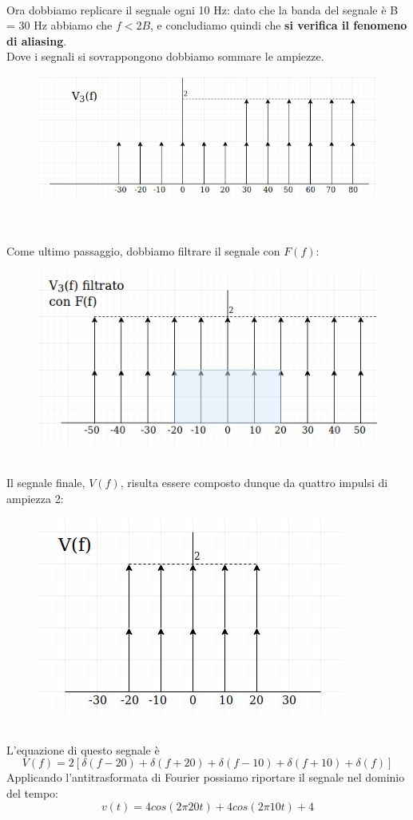 \documentclass[12pt,a4paper]{article}
\begin{document}
	\\Ora dobbiamo replicare il segnale ogni 10 Hz: dato che la banda del segnale è B = 30 Hz abbiamo che $f < 2B$, e concludiamo quindi che \textbf{si verifica il fenomeno di aliasing}.\\Dove i segnali si sovrappongono dobbiamo sommare le ampiezze.
	\begin{figure}[h!]
		\centering
		\includegraphics[scale=0.4]{./images/fourier54_6.png}
	\end{figure}
	\\ \\Come ultimo passaggio, dobbiamo filtrare il segnale con $F(f)$:
	\begin{figure}[h!]
		\centering
		\includegraphics[scale=0.4]{./images/fourier54_7.png}
	\end{figure}
	\\Il segnale finale, $V(f)$, risulta essere composto dunque da quattro impulsi di ampiezza 2:
	\begin{figure}[h!]
		\centering
		\includegraphics[scale=0.4]{./images/fourier54_8.png}
	\end{figure}
	\\L'equazione di questo segnale è 
	\[
		V(f) = 2\left[\delta(f-20) + \delta(f+20) + \delta(f-10) + \delta(f+10) + \delta(f)\right] 
	\]
	Applicando l'antitrasformata di Fourier possiamo riportare il segnale nel dominio del tempo:
	\[
		v(t) = 4cos(2\pi 20t) + 4cos(2\pi 10t) + 4
	\]
	\newpage
\end{document}
